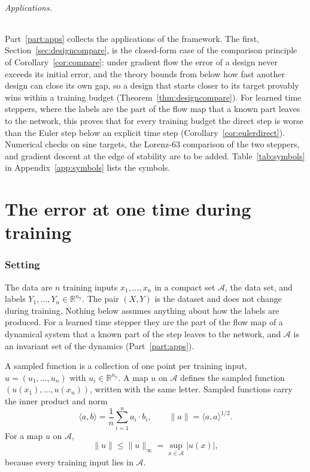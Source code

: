 \documentclass[11pt]{article}
\theoremstyle{definition}
\theoremstyle{remark}
\newcommand{\R}{\mathbb{R}}
\newcommand{\Aset}{\mathcal{A}}          %
\newcommand{\supA}[1]{\|#1\|_{\infty}}
\newcommand{\ip}[2]{\langle #1,#2\rangle}
\begin{document}
\paragraph{Applications.}
Part~\ref{part:apps} collects the applications of the framework.
The first, Section~\ref{sec:designcompare}, is the closed-form case of the comparison principle of Corollary~\ref{cor:compare}: under gradient flow the error of a design never exceeds its initial error, and the theory bounds from below how fast another design can close its own gap, so a design that starts closer to its target provably wins within a training budget (Theorem~\ref{thm:designcompare}).
For learned time steppers, where the labels are the part of the flow map that a known part leaves to the network, this proves that for every training budget the direct step is worse than the Euler step below an explicit time step (Corollary~\ref{cor:eulerdirect}).
Numerical checks on sine targets, the Lorenz-63 comparison of the two steppers, and gradient descent at the edge of stability are to be added.
Table~\ref{tab:symbols} in Appendix~\ref{app:symbols} lists the symbols.

\part{The error at one time during training}\label{part:onetime}

\section{Setting}\label{sec:setting}

The data are $n$ training inputs $x_1,\dots,x_n$ in a compact set $\Aset$, the data set, and labels $Y_1,\dots,Y_n \in \R^{n_{\mathrm y}}$.
The pair $(X, Y)$ is the dataset and does not change during training.
Nothing below assumes anything about how the labels are produced.
For a learned time stepper they are the part of the flow map of a dynamical system that a known part of the step leaves to the network, and $\Aset$ is an invariant set of the dynamics (Part~\ref{part:apps}).

A sampled function is a collection of one point per training input, $u = (u_1,\dots,u_n)$ with $u_i \in \R^{n_{\mathrm y}}$.
A map $u$ on $\Aset$ defines the sampled function $(u(x_1),\dots,u(x_n))$, written with the same letter.
Sampled functions carry the inner product and norm
\begin{equation}\label{eq:inner}
\ip{a}{b} = \frac1n\sum_{i=1}^n a_i\cdot b_i, \qquad \|a\| = \ip{a}{a}^{1/2}.
\end{equation}
For a map $u$ on $\Aset$,
\begin{equation}\label{eq:rmssup}
\|u\| \le \supA{u} = \sup_{x\in\Aset}|u(x)|,
\end{equation}
because every training input lies in $\Aset$.
\end{document}
